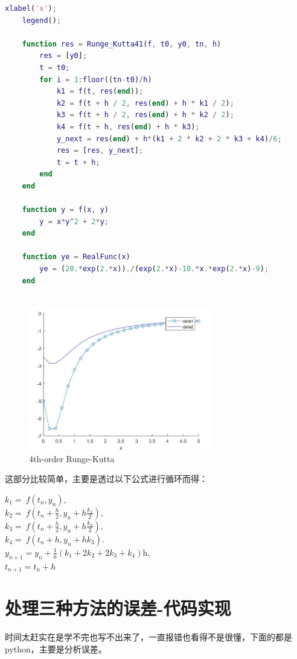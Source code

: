 \documentclass[12pt, a4paper, oneside]{ctexart}
\begin{document}
\begin{spacing}{2.0}
\begin{lstlisting}[language=MATLAB, caption=4th-order Runge-Kutta]
    xlabel('x');
    legend();
    
    function res = Runge_Kutta41(f, t0, y0, tn, h)
        res = [y0];
        t = t0;
        for i = 1:floor((tn-t0)/h)
            k1 = f(t, res(end));
            k2 = f(t + h / 2, res(end) + h * k1 / 2);
            k3 = f(t + h / 2, res(end) + h * k2 / 2);
            k4 = f(t + h, res(end) + h * k3);
            y_next = res(end) + h*(k1 + 2 * k2 + 2 * k3 + k4)/6;
            res = [res, y_next];
            t = t + h;
        end
    end
    
    function y = f(x, y)
        y = x*y^2 + 2*y;
    end
    
    function ye = RealFunc(x)
        ye = (20.*exp(2.*x))./(exp(2.*x)-10.*x.*exp(2.*x)-9);
    end
    
\end{lstlisting}
\begin{figure}[htbp][H]
    \centering
    \includegraphics[width=8cm]{Runge_Kutta411.jpg}
    \caption{4th-order Runge-Kutta}
\end{figure}

这部分比较简单，主要是透过以下公式进行循环而得：
\begin{center}
    
    $    k_1 = \ f(t_n, y_n)$, \\
    $k_2 = \ f\!\left(t_n + \frac{h}{2}, y_n + h\frac{k_1}{2}\right)$, \\ 
    $k_3 = \ f\!\left(t_n + \frac{h}{2}, y_n + h\frac{k_2}{2}\right)$, \\
    $k_4 = \ f\!\left(t_n + h, y_n + hk_3\right)$.\\
    $y_{n+1} = y_n + \frac{1}{6}\left(k_1 + 2k_2 + 2k_3 + k_4 \right)$h,\\
    $t_{n+1} = t_n + h$ \\


\end{center}
\section{处理三种方法的误差-代码实现}
时间太赶实在是学不完也写不出来了，一直报错也看得不是很懂，下面的都是python，主要是分析误差。

\end{spacing}
\end{document}
